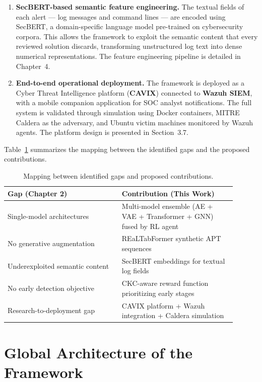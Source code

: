 \begin{enumerate}
    \item \textbf{SecBERT-based semantic feature engineering.}
    The textual fields of each alert --- log messages and command lines --- are encoded using SecBERT, a domain-specific language model pre-trained on cybersecurity corpora. This allows the framework to exploit the semantic content that every reviewed solution discards, transforming unstructured log text into dense numerical representations. The feature engineering pipeline is detailed in Chapter~4.

    \item \textbf{End-to-end operational deployment.}
    The framework is deployed as a Cyber Threat Intelligence platform (\textbf{CAVIX}) connected to \textbf{Wazuh SIEM}, with a mobile companion application for SOC analyst notifications. The full system is validated through simulation using Docker containers, MITRE Caldera as the adversary, and Ubuntu victim machines monitored by Wazuh agents. The platform design is presented in Section~3.7.
\end{enumerate}

Table~\ref{tab:gap_contribution} summarizes the mapping between the identified gaps and the proposed contributions.

\begin{table}[H]
\centering
\caption{Mapping between identified gaps and proposed contributions.}
\label{tab:gap_contribution}
\begin{tabular}{|p{0.45\linewidth}|p{0.45\linewidth}|}
\hline
\textbf{Gap (Chapter 2)} & \textbf{Contribution (This Work)} \\
\hline
Single-model architectures & Multi-model ensemble (AE + VAE + Transformer + GNN) fused by RL agent \\
\hline
No generative augmentation & REaLTabFormer synthetic APT sequences \\
\hline
Underexploited semantic content & SecBERT embeddings for textual log fields \\
\hline
No early detection objective & CKC-aware reward function prioritizing early stages \\
\hline
Research-to-deployment gap & CAVIX platform + Wazuh integration + Caldera simulation \\
\hline
\end{tabular}
\end{table}


\section{Global Architecture of the Framework}

